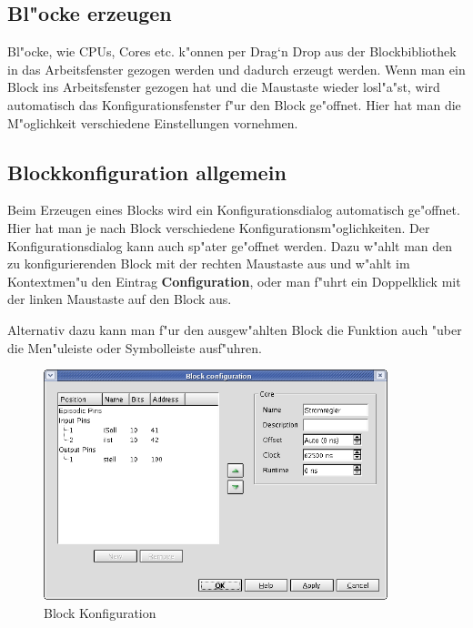 \documentclass[a4paper,titlepage,12pt,ngerman]{scrbook}
\begin{document}
\subsection{Bl"ocke erzeugen}
Bl"ocke, wie CPUs, Cores etc. k"onnen per Drag`n Drop aus der Blockbibliothek in das Arbeitsfenster gezogen werden und dadurch erzeugt werden. Wenn man ein Block ins Arbeitsfenster gezogen hat und die Maustaste wieder losl"a"st, wird automatisch das Konfigurationsfenster f"ur den Block ge"offnet. Hier hat man die M"oglichkeit verschiedene Einstellungen vornehmen.

\subsection{Blockkonfiguration allgemein}
Beim Erzeugen eines Blocks wird ein Konfigurationsdialog automatisch ge"offnet. Hier hat man je nach Block verschiedene Konfigurationsm"oglichkeiten. Der Konfigurationsdialog kann auch sp"ater ge"offnet werden. Dazu w"ahlt man den zu konfigurierenden Block mit der rechten Maustaste aus und w"ahlt im Kontextmen"u den Eintrag {\bf Configuration}, oder man f"uhrt ein Doppelklick mit der linken Maustaste auf den Block aus.\par
Alternativ dazu kann man f"ur den ausgew"ahlten Block die Funktion auch "uber die Men"uleiste oder Symbolleiste ausf"uhren. \par

\begin{figure}[htbp]

\begin{center}

\includegraphics[width=10cm]{CoreBlockConfiguration}

\caption{Block Konfiguration}\label{test}

\end{center}

\end{figure}
\end{document}
